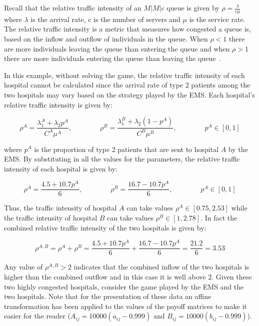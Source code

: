 Recall that the relative traffic intensity of an \(M|M|c\) queue is given by
\(\rho = \frac{\lambda}{c \mu}\) where \(\lambda\) is the arrival rate, c is
the number of servers and \(\mu\) is the service rate.
The relative traffic intensity is a metric that measures how congested a queue
is, based on the inflow and outflow of individuals in the queue.
When \(\rho < 1\) there are more individuals leaving the queue than entering
the queue and when \(\rho > 1\) there are more individuals entering the queue
than leaving the queue~\cite{almeida2018note}.

In this example, without solving the game, the relative traffic intensity of
each hospital cannot be calculated since the arrival rate of type 2 patients
among the two hospitals may vary based on the strategy played by the EMS.
Each hospital's relative traffic intensity is given by:

\begin{equation}
    \rho^A = \frac{\lambda_1^A + \lambda_2 p^A}{C^A \mu^A}, \qquad \qquad
    \rho^B = \frac{\lambda_1^B + \lambda_2 (1 - p^A)}{C^B \mu^B}, \qquad \qquad
    p^A \in [0, 1]
\end{equation}

where \(p^A\) is the proportion of type 2 patients that are sent to hospital
\(A\) by the EMS.
By substituting in all the values for the parameters, the relative traffic
intensity of each hospital is given by:

\begin{equation}
    \rho^A = \frac{4.5 + 10.7 p^A}{6}, \qquad \qquad
    \rho^B = \frac{16.7 - 10.7 p^A}{6}, \qquad \qquad
    p^A \in [0, 1]
\end{equation}

Thus, the traffic intensity of hospital \(A\) can take values \(\rho^A \in
[0.75, 2.53]\) while the traffic intensity of hospital \(B\) can take values
\(\rho^B \in [1, 2.78]\).
In fact the combined relative traffic intensity of the two hospitals is given
by:

\begin{equation}
    \rho^{A, B} = \rho^A + \rho^B = \frac{4.5 + 10.7 p^A}{6} +
    \frac{16.7 - 10.7 p^A}{6} = \frac{21.2}{6} = 3.53
\end{equation}

Any value of \(\rho^{A, B} > 2\) indicates that the combined inflow of the
two hospitals is higher than the combined outflow and in this case it is well
above \(2\).
Given these two highly congested hospitals, consider the game played by the
EMS and the two hospitals.
Note that for the presentation of these data an affine transformation has been
applied to the values of the payoff matrices to make it easier for the reader
(\(A_{ij} = 10000 (a_{ij} - 0.999) \text{ and }
B_{ij} = 10000 (b_{ij} - 0.999)\)).

